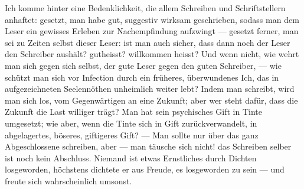 Ich komme hinter eine Bedenklichkeit, die allem Schreiben und Schriftstellern anhaftet: gesetzt, man habe gut, suggestiv wirksam geschrieben, sodass man dem Leser ein gewisses Erleben zur Nachempfindung aufzwingt — gesetzt ferner, man sei zu Zeiten selbst dieser Leser: ist man auch sicher, dass dann noch der Leser den Schreiber aushält? gutheisst? willkommen heisst? Und wenn nicht, wie wehrt man sich gegen sich selbst, der gute Leser gegen den guten Schreiber, — wie schützt man sich vor Infection durch ein früheres, überwundenes Ich, das in aufgezeichneten Seelennöthen unheimlich weiter lebt? Indem man schreibt, wird man sich los, vom Gegenwärtigen an eine Zukunft; aber wer steht dafür, dass die Zukunft die Last williger trägt? Man hat sein psychisches Gift in Tinte umgesetzt; wie aber, wenn die Tinte sich in Gift zurückverwandelt, in abgelagertes, böseres, giftigeres Gift? — Man sollte nur über das ganz Abgeschlossene schreiben, aber — man täusche sich nicht! das Schreiben selber ist noch kein Abschluss. Niemand ist etwas Ernstliches durch Dichten losgeworden, höchstens dichtete er aus Freude, es losgeworden zu sein — und freute sich wahrscheinlich umsonst.
\par

